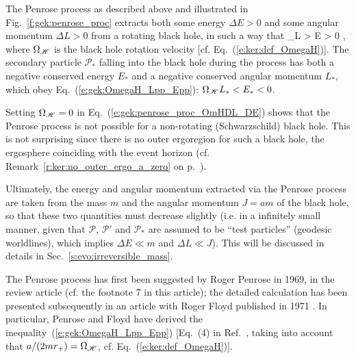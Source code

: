 \begin{prop}
The Penrose process as described above and illustrated in Fig.~\ref{f:gek:penrose_proc}
extracts both some energy $\Delta E > 0$  and some angular momentum $\Delta L > 0$ from
a rotating black hole, in such a way that
\be \label{e:gek:penrose_proc_OmHDL_DE}
    \Omega_{\Hor}\Delta L > \Delta E > 0 ,
\ee
where $\Omega_{\mathscr{H}}$ is the black hole rotation velocity [cf. Eq.~(\ref{e:ker:def_OmegaH})].
The secondary particle $\mathscr{P}_*$ falling into the black hole during the
process has both a negative conserved energy $E_*$ and a negative conserved angular
momentum $L_*$, which obey Eq.~(\ref{e:gek:OmegaH_Lpp_Epp}):
$\Omega_{\mathscr{H}} L_* < E_* < 0$.
\end{prop}

\begin{remark}
Setting $\Omega_{\mathscr{H}} = 0$ in Eq.~(\ref{e:gek:penrose_proc_OmHDL_DE}) shows
that the Penrose process is not possible for a non-rotating (Schwarzschild) black hole.
This is not surprising since there is no outer ergoregion for such a black hole, the
ergosphere coinciding with the event horizon (cf. Remark~\ref{r:ker:no_outer_ergo_a_zero} on
p.~\pageref{r:ker:no_outer_ergo_a_zero}).
\end{remark}

Ultimately, the energy and angular momentum extracted via the Penrose process
are taken from the mass $m$ and the angular momentum $J = am$
of the black hole, so that these two quantities must decrease slightly
(i.e. in a infinitely small manner, given that $\mathscr{P}$, $\mathscr{P}'$
and $\mathscr{P}_*$ are assumed to be ``test particles'' (geodesic worldlines),
which implies $\Delta E \ll m$ and $\Delta L \ll J$).
This will be discussed in details in Sec.~\ref{s:evo:irreversible_mass}.

\begin{hist}
The Penrose process has first been suggested by Roger Penrose
in 1969,
in the review article \cite{Penro69} (cf. the footnote 7 in this article);
the detailed calculation has been presented subsequently in an
article with Roger Floyd published in 1971 \cite{PenroF71}.
In particular, Penrose and Floyd have derived the inequality~(\ref{e:gek:OmegaH_Lpp_Epp}) [Eq.~(4) in Ref.~\cite{PenroF71}, taking into account that $a/(2mr_+) = \Omega_{\mathscr{H}}$, cf. Eq.~(\ref{e:ker:def_OmegaH})].
\end{hist}



